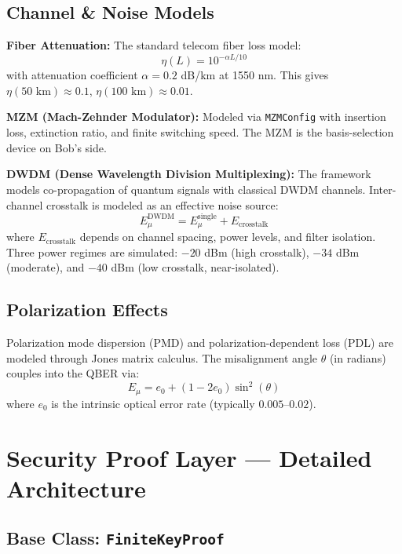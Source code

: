 \documentclass[11pt,a4paper,oneside]{report}
\begin{document}
\subsection{Channel \& Noise Models}

\textbf{Fiber Attenuation:} The standard telecom fiber loss model:
\begin{equation}
\eta(L) = 10^{-\alpha L/10}
\end{equation}
with attenuation coefficient $\alpha = 0.2$ dB/km at 1550 nm. This gives $\eta(50\text{ km}) \approx 0.1$, $\eta(100\text{ km}) \approx 0.01$.

\textbf{MZM (Mach-Zehnder Modulator):} Modeled via \texttt{MZMConfig} with insertion loss, extinction ratio, and finite switching speed. The MZM is the basis-selection device on Bob's side.

\textbf{DWDM (Dense Wavelength Division Multiplexing):} The framework models co-propagation of quantum signals with classical DWDM channels. Inter-channel crosstalk is modeled as an effective noise source:
\begin{equation}
E_\mu^{\text{DWDM}} = E_\mu^{\text{single}} + E_{\text{crosstalk}}
\end{equation}
where $E_{\text{crosstalk}}$ depends on channel spacing, power levels, and filter isolation. Three power regimes are simulated: $-20$ dBm (high crosstalk), $-34$ dBm (moderate), and $-40$ dBm (low crosstalk, near-isolated).

\subsection{Polarization Effects}

Polarization mode dispersion (PMD) and polarization-dependent loss (PDL) are modeled through Jones matrix calculus. The misalignment angle $\theta$ (in radians) couples into the QBER via:
\begin{equation}
E_\mu = e_0 + (1 - 2e_0)\sin^2(\theta)
\end{equation}
where $e_0$ is the intrinsic optical error rate (typically $0.005$–$0.02$).

\section{Security Proof Layer — Detailed Architecture}

\subsection{Base Class: \texttt{FiniteKeyProof}}
\end{document}
